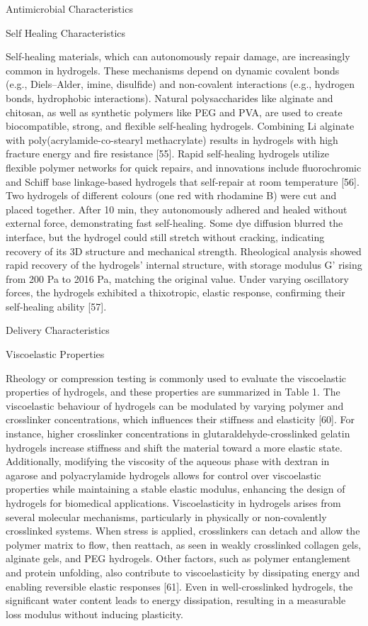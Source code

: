 \documentclass[../../main-notes.tex]{subfiles}
\begin{document}
Antimicrobial Characteristics 

Self Healing Characteristics 

Self-healing materials, which can autonomously repair damage, are increasingly common in hydrogels. 
These mechanisms depend on dynamic covalent bonds (e.g., Diels–Alder, imine, disulfide) and non-covalent interactions (e.g., hydrogen bonds, hydrophobic interactions). 
Natural polysaccharides like alginate and chitosan, as well as synthetic polymers like PEG and PVA, are used to create biocompatible, strong, and flexible self-healing hydrogels. 
Combining Li alginate with poly(acrylamide-co-stearyl methacrylate) results in hydrogels with high fracture energy and fire resistance [55]. 
Rapid self-healing hydrogels utilize flexible polymer networks for quick repairs, and innovations include fluorochromic and Schiff base linkage-based hydrogels that self-repair at room temperature [56]. 
Two hydrogels of different colours (one red with rhodamine B) were cut and placed together. 
After 10 min, they autonomously adhered and healed without external force, demonstrating fast self-healing. 
Some dye diffusion blurred the interface, but the hydrogel could still stretch without cracking, indicating recovery of its 3D structure and mechanical strength. 
Rheological analysis showed rapid recovery of the hydrogels’ internal structure, with storage modulus G’ rising from 200 Pa to 2016 Pa, matching the original value. Under varying oscillatory forces, the hydrogels exhibited a thixotropic, elastic response, confirming their self-healing ability [57].




Delivery Characteristics 

Viscoelastic Properties

Rheology or compression testing is commonly used to evaluate the viscoelastic properties of hydrogels, and these properties are summarized in Table 1. 
The viscoelastic behaviour of hydrogels can be modulated by varying polymer and crosslinker concentrations, which influences their stiffness and elasticity [60]. 
For instance, higher crosslinker concentrations in glutaraldehyde-crosslinked gelatin hydrogels increase stiffness and shift the material toward a more elastic state. 
Additionally, modifying the viscosity of the aqueous phase with dextran in agarose and polyacrylamide hydrogels allows for control over viscoelastic properties while maintaining a stable elastic modulus, enhancing the design of hydrogels for biomedical applications. 
Viscoelasticity in hydrogels arises from several molecular mechanisms, particularly in physically or non-covalently crosslinked systems.
When stress is applied, crosslinkers can detach and allow the polymer matrix to flow, then reattach, as seen in weakly crosslinked collagen gels, alginate gels, and PEG hydrogels. 
Other factors, such as polymer entanglement and protein unfolding, also contribute to viscoelasticity by dissipating energy and enabling reversible elastic responses [61]. 
Even in well-crosslinked hydrogels, the significant water content leads to energy dissipation, resulting in a measurable loss modulus without inducing plasticity.
\end{document}
